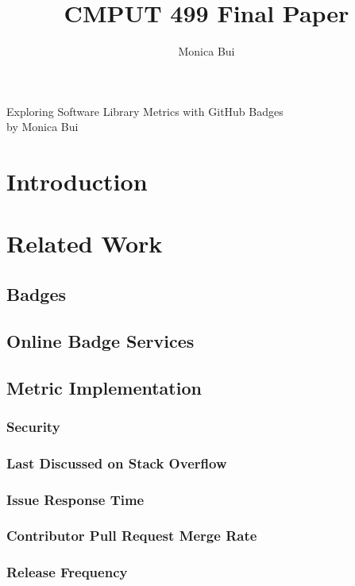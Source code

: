 \documentclass[12pt]{article}
\title{CMPUT 499 Final Paper}
\author{Monica Bui}
\begin{document}
\begin{titlepage}
    \centering
    \large
    \vspace{1cm}
    Exploring Software Library Metrics with GitHub Badges \\
    \vspace{1cm}
    by
    \vspace{1cm}
    Monica Bui
\end{titlepage}

\section{Introduction}

\section{Related Work}

\subsection{Badges}

\subsection{Online Badge Services}

\subsection{Metric Implementation}
\subsubsection{Security}
\subsubsection{Last Discussed on Stack Overflow}
\subsubsection{Issue Response Time}
\subsubsection{Contributor Pull Request Merge Rate}
\subsubsection{Release Frequency}
\end{document}
